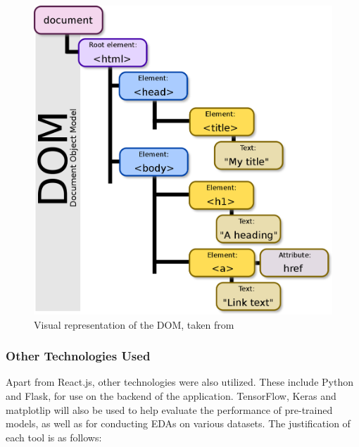 \documentclass[12pt, a4paper]{article}
\begin{document}
\begin{itemize}
    \begin{figure}[H]
        \centering
        \includegraphics[scale=0.3]{images/dom.png}
        \caption{Visual representation of the DOM, taken from \cite{wikidom}}
        \label{fig:dom}
    \end{figure}

    
\end{itemize}

\subsubsection{Other Technologies Used}
\label{othertech}
Apart from React.js, other technologies were also utilized. These include Python and Flask, for use on the backend of the application. TensorFlow, Keras and matplotlip will also be used to help evaluate the performance of pre-trained models, as well as for conducting EDAs on various datasets. The justification of each tool is as follows:
\end{document}
